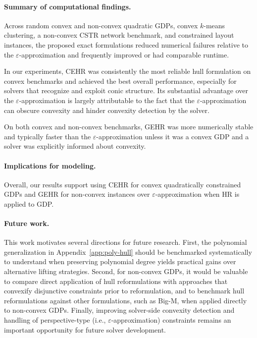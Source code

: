 \documentclass[11pt]{article}
\begin{document}
\paragraph{Summary of computational findings.}
Across random convex and non-convex quadratic GDPs, convex $k$-means clustering, a non-convex CSTR network benchmark, and constrained layout instances, the proposed exact formulations reduced numerical failures relative to the $\varepsilon$-approximation and frequently improved or had comparable runtime.

In our experiments, CEHR was consistently the most reliable hull formulation on convex benchmarks and achieved the best overall performance, especially for solvers that recognize and exploit conic structure. 
Its substantial advantage over the $\varepsilon$-approximation is largely attributable to the fact that the $\varepsilon$-approximation can obscure convexity and hinder convexity detection by the solver.

On both convex and non-convex benchmarks, GEHR was more numerically stable and typically faster than the $\varepsilon$-approximation unless it was a convex GDP and a solver was explicitly informed about convexity.

\paragraph{Implications for modeling.}
Overall, our results support using CEHR for convex quadratically constrained GDPs and GEHR for non-convex instances over $\varepsilon$-approximation when HR is applied to GDP.


\paragraph{Future work.}
This work motivates several directions for future research. First, the polynomial generalization in Appendix~\ref{app:poly-hull} should be benchmarked systematically to understand when preserving polynomial degree yields practical gains over alternative lifting strategies. 
Second, for non-convex GDPs, it would be valuable to compare direct application of hull reformulations with approaches that convexify disjunctive constraints prior to reformulation, and to benchmark hull reformulations against other formulations, such as Big-M, when applied directly to non-convex GDPs.
Finally, improving solver-side convexity detection and handling of perspective-type (i.e., $\varepsilon$-approximation) constraints remains an important opportunity for future solver development.
\end{document}

